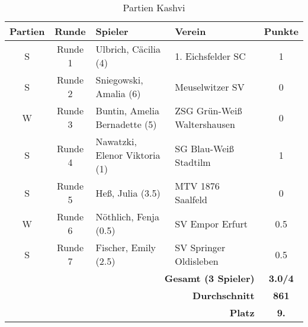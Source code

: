 \begin{table}[H]
\begin{tabular}{|c|c|l|l|c|}
\hline
\textbf{Partien} & \textbf{Runde} & \textbf{Spieler} & \textbf{Verein} & \textbf{Punkte} \\ \hline
S & Runde 1 & Ulbrich, Cäcilia (4) & 1. Eichsfelder SC & 1 \\ \hline
S & Runde 2 & Sniegowski, Amalia (6) & Meuselwitzer SV & 0 \\ \hline
W & Runde 3 & Buntin, Amelia Bernadette (5) & ZSG Grün-Weiß Waltershausen & 0 \\ \hline
S & Runde 4 & Nawatzki, Elenor Viktoria (1) & SG Blau-Weiß Stadtilm & 1 \\ \hline
S & Runde 5 & Heß, Julia (3.5) & MTV 1876 Saalfeld & 0 \\ \hline
W & Runde 6 & Nöthlich, Fenja (0.5) & SV Empor Erfurt & 0.5 \\ \hline
S & Runde 7 & Fischer, Emily (2.5) & SV Springer Oldisleben & 0.5 \\ \hline
\multicolumn{4}{|r|}{\textbf{Gesamt (3 Spieler)}} & \textbf{3.0/4} \\ \hline
\multicolumn{4}{|r|}{\textbf{Durchschnitt}} & \textbf{861} \\ \hline
\multicolumn{4}{|r|}{\textbf{Platz}} & \textbf{9.} \\ \hline
\end{tabular}
\caption{Partien Kashvi}
\label{label:Tabelle_Kashvi}
\end{table}